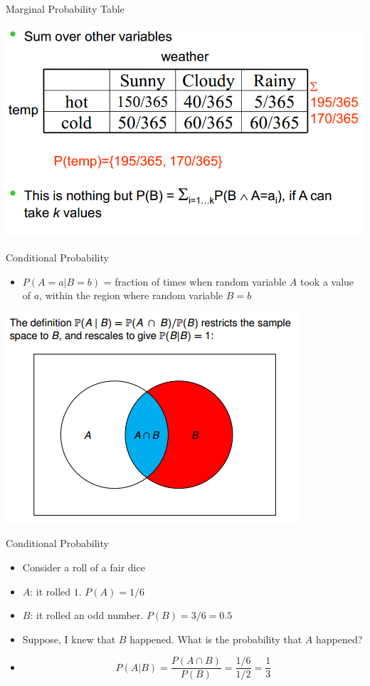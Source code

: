\documentclass{beamer}
\begin{document}
\begin{frame}{Marginal Probability Table}
    \begin{center}
        \includegraphics[scale=0.3]{marginalProbTbl2.png}
    \end{center}
\end{frame}

\begin{frame}{Conditional Probability}
    \begin{itemize}
        \item $P(A=a|B=b)$ = fraction of times when random variable $A$ took a value of $a$, within the region where random variable $B=b$
    \end{itemize}
    \begin{center}
        \includegraphics[scale=0.5]{condnlProb.png}
    \end{center}
\end{frame}

\begin{frame}{Conditional Probability}
    \begin{itemize}
        \item Consider a roll of a fair dice
        \item $A$: it rolled $1$. $P(A) = 1/6$ 
        \item $B$: it rolled an odd number. $P(B) = 3/6 = 0.5$
        \item Suppose, I knew that $B$ happened. What is the probability that $A$ happened? \pause
        \item $$P(A|B) = \frac{P(A \cap B)}{P(B)} = \frac{1/6}{1/2} = \frac{1}{3}$$
    \end{itemize}
\end{frame}
\end{document}
